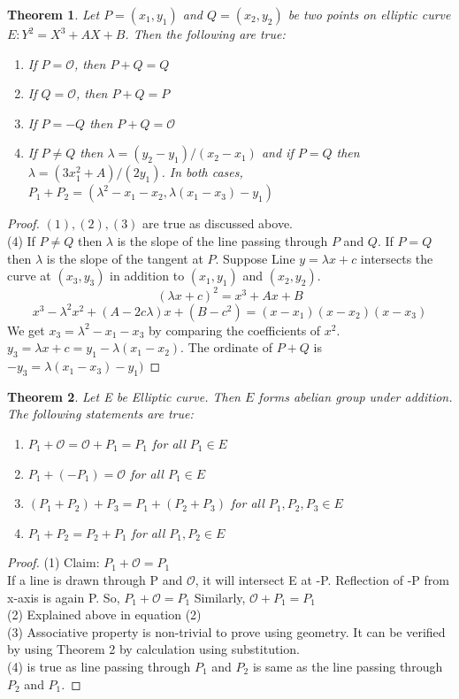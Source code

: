 \documentclass[a4paper,12pt]{report}
\newtheorem{theorem}{Theorem}
\begin{document}
\begin{theorem}
	Let $P=(x_1,y_1)$ and $Q=(x_2,y_2)$ be two points on elliptic curve $E:Y^2=X^3+
		AX+B$. Then the following are true:
	\begin{enumerate}
		\item If $P=\mathscr{O}$, then $P+Q=Q$
		\item If $Q=\mathscr{O}$, then $P+Q=P$
		\item If $P=-Q$ then $P+Q=\mathscr{O}$
		\item If $P \neq Q$ then $\lambda = (y_2-y_1)/(x_2-x_1)$ and if $P=Q$ then\\ $\lambda = (3x_1^2+A)/(2y_1)$. In both cases,
		      \\$P_1+P_2 = (\lambda ^2 - x_1 - x_2, \lambda (x_1 - x_3)-y_1)$
	\end{enumerate}
\end{theorem}

\begin{proof}
	$(1),(2),(3)$ are true as discussed above.\\
	(4) If $P\neq Q$ then $\lambda$ is the slope of the line passing through $P$ and $Q$. If $P=Q$ then $\lambda$ is the slope of the tangent at $P$. Suppose Line $y=\lambda x+c$ intersects the curve at $(x_3,y_3)$ in addition to $(x_1,y_1)$ and $(x_2,y_2)$.
	$$(\lambda x+c)^2=x^3+Ax+B$$
	$$x^3-\lambda ^2 x^2 +(A-2c\lambda)x+(B-c^2)=(x-x_1)(x-x_2)(x-x_3)$$
	We get $x_3 = \lambda ^2-x_1-x_3$ by comparing the coefficients of $x^2$. $y_3=\lambda x+c=y_1-\lambda(x_1-x_2)$. The ordinate of $P+Q$ is $-y_3=\lambda (x_1 - x_3)-y_1)$
\end{proof}
\begin{theorem}
	Let E be Elliptic curve. Then $E$ forms abelian group under addition. The following statements are true:
	\begin{enumerate}
		\item $P_1+\mathscr{O}=\mathscr{O}+P_1=P_1$ for all $P_1 \in E$
		\item $P_1+(-P_1)=\mathscr{O}$ for all $P_1 \in E$
		\item $(P_1+P_2)+P_3=P_1+(P_2+P_3)$ for all $P_1,P_2,P_3 \in E$
		\item $P_1+P_2=P_2+P_1$ for all $P_1,P_2 \in E$
	\end{enumerate}
\end{theorem}
\begin{proof}
	(1) Claim: $P_1+\mathscr{O}=P_1$ \\
	If a line is drawn through P and $\mathscr{O}$, it will intersect E at -P. Reflection of -P from x-axis is again P. So, $P_1+\mathscr{O}=P_1$
	Similarly, $\mathscr{O}+P_1=P_1$\\
	(2) Explained above in equation (2)\\
	(3) Associative property is non-trivial to prove using geometry. It can be verified by using Theorem 2 by calculation using substitution.\\
	(4) is true as line passing through $P_1$ and $P_2$ is same as the line passing through $P_2$ and $P_1$.
\end{proof}
\end{document}
